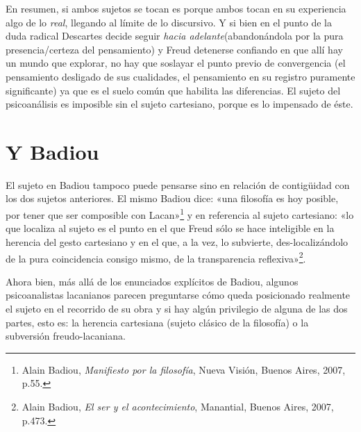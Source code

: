 En resumen, si ambos sujetos se tocan es porque ambos tocan en su experiencia algo de lo \emph{real}, llegando al límite de lo discursivo. Y si bien en el punto de la duda radical Descartes decide seguir \emph{hacia adelante}(abandonándola por la pura presencia/certeza del pensamiento) y Freud detenerse confiando en que allí hay un mundo que explorar, no hay que soslayar el punto previo de convergencia (el pensamiento desligado de sus cualidades, el pensamiento en su registro puramente significante) ya que es el suelo común que habilita las diferencias. El sujeto del psicoanálisis es imposible sin el sujeto cartesiano, porque es lo impensado de éste.

\section{Y Badiou}

El sujeto en Badiou tampoco puede pensarse sino en relación de contigüidad con los dos sujetos anteriores. El mismo Badiou dice: «una filosofía es hoy posible, por tener que ser composible con Lacan»\footnote{Alain Badiou, \emph{Manifiesto por la filosofía}, Nueva Visión, Buenos Aires, 2007, p.55.} y en referencia al sujeto cartesiano: «lo que localiza al sujeto es el punto en el que Freud sólo se hace inteligible en la herencia del gesto cartesiano y en el que, a la vez, lo subvierte, des-localizándolo de la pura coincidencia consigo mismo, de la transparencia reflexiva»\footnote{Alain Badiou, \emph{El ser y el acontecimiento}, Manantial, Buenos Aires, 2007, p.473.}.

Ahora bien, más allá de los enunciados explícitos de Badiou, algunos psicoanalistas lacanianos parecen preguntarse cómo queda posicionado realmente el sujeto en el recorrido de su obra y si hay algún privilegio de alguna de las dos partes, esto es: la herencia cartesiana (sujeto clásico de la filosofía) o la subversión freudo-lacaniana.

